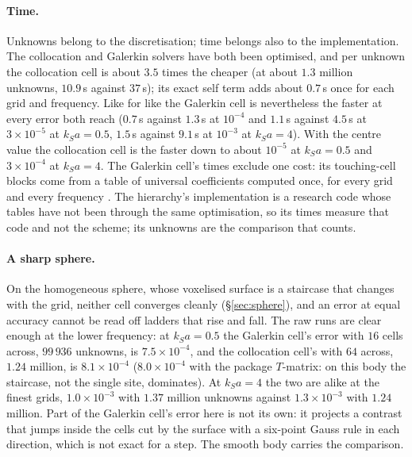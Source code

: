 \documentclass[11pt,a4paper]{article}
\begin{document}
\paragraph{Time.} Unknowns belong to the discretisation; time belongs also to the implementation. The
collocation and Galerkin solvers have both been optimised, and per unknown the collocation cell is about
$3.5$ times the cheaper (at about $1.3$ million unknowns, $10.9$\,s against $37$\,s); its exact self term
adds about $0.7$\,s once for each grid and frequency. Like for like the Galerkin cell is nevertheless the
faster at every error both reach ($0.7$\,s against $1.3$\,s at $10^{-4}$ and $1.1$\,s against $4.5$\,s at
$3\times10^{-5}$ at $k_Sa=0.5$, $1.5$\,s against $9.1$\,s at $10^{-3}$ at $k_Sa=4$). With the centre value
the collocation cell is the faster down to about $10^{-5}$ at $k_Sa=0.5$ and $3\times10^{-4}$ at $k_Sa=4$.
The Galerkin cell's times exclude one cost: its touching-cell blocks come from a table of universal
coefficients computed once, for every grid and every frequency \citep{NestorCoupling2026}. The hierarchy's
implementation is a research code whose tables have not been through the same optimisation, so its
times measure that code and not the scheme; its unknowns are the comparison that counts.

\paragraph{A sharp sphere.} On the homogeneous sphere, whose voxelised surface is a staircase that
changes with the grid, neither cell converges cleanly (\S\ref{sec:sphere}), and an error at equal
accuracy cannot be read off ladders that rise and fall. The raw runs are clear enough at the lower
frequency: at $k_Sa=0.5$ the Galerkin cell's error with $16$ cells across, $99\,936$ unknowns, is
$7.5\times10^{-4}$, and the collocation cell's with $64$ across, $1.24$ million, is $8.1\times10^{-4}$
($8.0\times10^{-4}$ with the package $T$-matrix: on this body the staircase, not the single site,
dominates). At $k_Sa=4$ the two are alike at the finest grids, $1.0\times10^{-3}$ with $1.37$ million
unknowns against $1.3\times10^{-3}$ with $1.24$ million. Part of the Galerkin cell's error here is not its
own: it projects a contrast that jumps inside the cells cut by the surface with a six-point Gauss rule in
each direction, which is not exact for a step. The smooth body carries the comparison.
\end{document}
